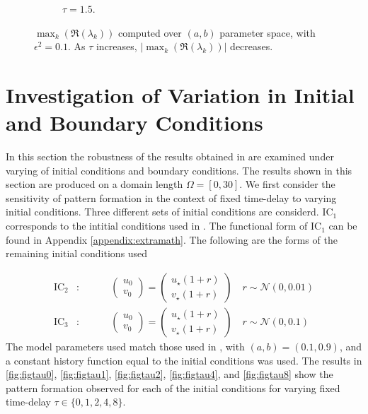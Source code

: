 \documentclass[12pt]{report}
\begin{document}
\begin{figure}[H]
\begin{subfigure}[b]{0.45\textwidth}
        \caption{$\tau=1.5$.}
        \label{}
    \end{subfigure}
    \caption{$\max_k(\Re(\lambda_k))$ computed over $(a,b)$ parameter space, with $\epsilon^2=0.1$. As $\tau$ increases, $|\max_k(\Re(\lambda_k))|$ decreases.}
    \label{fig:fixbif2}
\end{figure}


\section{Investigation of Variation in Initial and Boundary Conditions}
In this section the robustness of the results obtained in \cite{gaffmonk} are examined under varying of initial conditions and boundary conditions. The results shown in this section are produced on a domain length $\Omega=[0,30]$. We first consider the sensitivity of pattern formation in the context of fixed time-delay to varying initial conditions. Three different sets of initial conditions are considerd. $\text{IC}_1$ corresponds to the intitial conditions used in \cite{gaffmonk}. The functional form of $\text{IC}_1$ can be found in Appendix \ref{appendix:extramath}. The following are the forms of the remaining initial conditions used

\begin{align}
\text{IC}_2&:\quad\quad\quad\begin{pmatrix}u_0\\v_0\end{pmatrix}=\begin{pmatrix}u_\star(1+r)\\v_\star(1+r)\end{pmatrix}\quad r\sim\mathcal{N}(0,0.01)\\
\text{IC}_3&:\quad\quad\quad\begin{pmatrix}u_0\\v_0\end{pmatrix}=\begin{pmatrix}u_\star(1+r)\\v_\star(1+r)\end{pmatrix}\quad r\sim\mathcal{N}(0,0.1)
\end{align}
The model parameters used match those used in \cite{gaffmonk}, with $(a,b)=(0.1,0.9)$, and a constant history function equal to the initial conditions was used. The results in \ref{fig:figtau0}, \ref{fig:figtau1}, \ref{fig:figtau2}, \ref{fig:figtau4}, and \ref{fig:figtau8} show the pattern formation observed for each of the initial conditions for varying fixed time-delay $\tau\in\{0,1,2,4,8 \}$.
\end{document}
